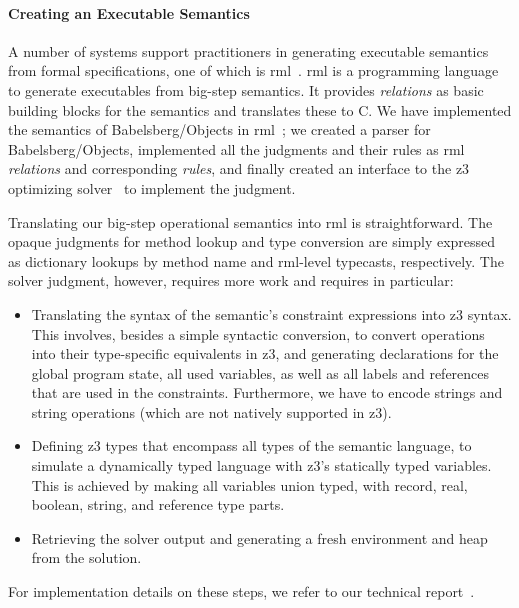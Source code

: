 \paragraph*{Creating an Executable Semantics}
A number of systems support practitioners in generating executable semantics
from formal specifications, one of which is
\gls{rml}~\cite{pettersson1994rml}. \gls{rml} is a programming language to
generate executables from big-step semantics. It provides \emph{relations} as
basic building blocks for the semantics and translates these to C\@. We have
implemented the semantics of Babelsberg/Objects in
\gls{rml}~\cite{felgentreff+:2015:babelsbergrml}; we created a parser for
Babelsberg/Objects, implemented all the judgments and their rules as \gls{rml}
\emph{relations} and corresponding \emph{rules}, and finally created an
interface to the \gls{z3} optimizing solver~\cite{bjornernuz} to implement the
 judgment.

Translating our big-step operational semantics into \gls{rml} is
straightforward. The opaque judgments for method lookup and type conversion are
simply expressed as dictionary lookups by method name and \gls{rml}-level
typecasts, respectively. The solver judgment, however, requires more work and
requires in particular:
\begin{itemize}
\item Translating the syntax of the semantic's constraint expressions into
  \gls{z3} syntax. This involves, besides a simple syntactic conversion, to
  convert operations into their type-specific equivalents in \gls{z3}, and
  generating declarations for the global program state, all used variables, as
  well as all labels and references that are used in the
  constraints. Furthermore, we have to encode strings and string operations
  (which are not natively supported in \gls{z3}).
\item Defining \gls{z3} types that encompass all types of the semantic language,
  to simulate a dynamically typed language with \gls{z3}'s statically typed
  variables. This is achieved by making all variables union typed, with record,
  real, boolean, string, and reference type parts.
\item Retrieving the solver output and generating a fresh environment and heap
  from the solution.
\end{itemize}
For implementation details on these steps, we refer to our technical
report~\cite{felgentreff+:2015:babelsbergrml}.

